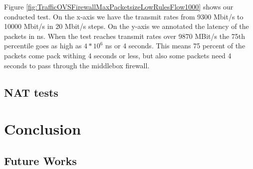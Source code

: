 \documentclass[11pt,a4paper,twoside,openright,bachelor,english]{netthesis}
\begin{document}
Figure \ref{fig:TrafficOVSFirewallMaxPacketsizeLowRulesFlow1000} shows our conducted test. On the x-axis we have the transmit rates from 9300 Mbit/s to 10000 Mbit/s in 20 Mbit/s steps. On the y-axis we annotated the latency of the packets in ns. 
When the test reaches transmit rates over 9870 MBit/s the 75th percentile goes as high as $4*10^6 $ ns or 4 seconds. This means 75 percent of the packets come pack withing 4 seconds or less, but also some packets need 4 seconds to pass through the middlebox firewall. 

\section{NAT tests}

\chapter{Conclusion}

\section{Future Works}


%
\appendix
%

%





\end{document}
